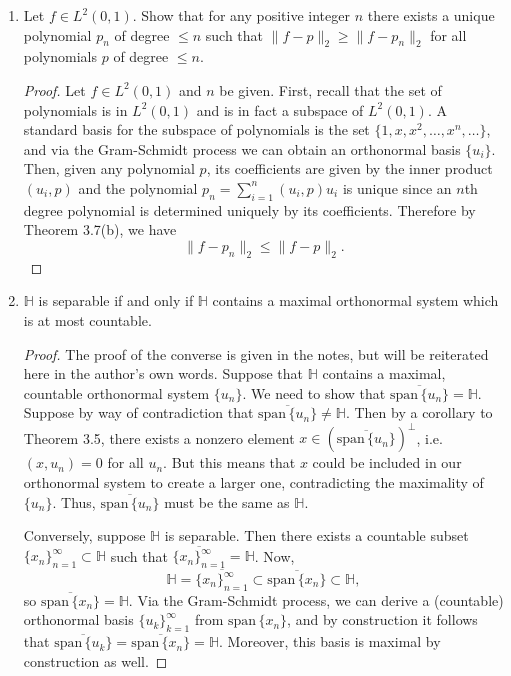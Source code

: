 \documentclass[11pt,oneside,english]{amsart}
\theoremstyle{definition}
\newcommand{\MB}[1]{\mathbb{#1}}
\begin{document}
\begin{enumerate}
\item Let $f\in L^2(0,1)$. Show that for any positive integer $n$ there exists a unique polynomial $p_n$ of degree $\leq n$ such that $\|f-p\|_2\geq \|f-p_n\|_2$ for all polynomials $p$ of degree $\leq n$.

\begin{proof}
Let $f\in L^2(0,1)$ and $n$ be given. First, recall that the set of polynomials is in $L^2(0,1)$ and is in fact a subspace of $L^2(0,1)$. A standard basis for the subspace of polynomials is the set $\{1,x,x^2,\ldots,x^n,\ldots\}$, and via the Gram-Schmidt process we can obtain an orthonormal basis $\{u_i\}$. Then, given any polynomial $p$, its coefficients are given by the inner product $(u_i,p)$ and the polynomial $p_n=\sum_{i=1}^n(u_i,p)u_i$ is unique since an $n$th degree polynomial is determined uniquely by its coefficients. Therefore by Theorem 3.7(b), we have
\[
\|f-p_n\|_2\leq \|f-p\|_2.
\]
\end{proof}

\item $\MB{H}$ is separable if and only if $\MB{H}$ contains a maximal orthonormal system which is at most countable.

\begin{proof}
The proof of the converse is given in the notes, but will be reiterated here in the author's own words. Suppose that $\MB{H}$ contains a maximal, countable orthonormal system $\{u_n\}$. We need to show that $\overline{\text{span}\,\{u_n\}}=\MB{H}$. Suppose by way of contradiction that $\overline{\text{span}\,\{u_n\}}\neq\MB{H}$. Then by a corollary to Theorem 3.5, there exists a nonzero element $x\in \left(\overline{\text{span}\,\{u_n\}}\right)^\perp$, i.e. $(x,u_n)=0$ for all $u_n$. But this means that $x$ could be included in our orthonormal system to create a larger one, contradicting the maximality of $\{u_n\}$. Thus, $\overline{\text{span}\,\{u_n\}}$ must be the same as $\MB{H}$.

Conversely, suppose $\MB{H}$ is separable. Then there exists a countable subset $\{x_n\}_{n=1}^\infty\subset\MB{H}$ such that $\overline{\{x_n\}_{n=1}^\infty}=\MB{H}$. Now,
\[
\MB{H}=\overline{\{x_n\}_{n=1}^\infty}\subset\overline{\text{span}\,\{x_n\}}\subset\MB{H},
\]
so $\overline{\text{span}\,\{x_n\}}=\MB{H}$. Via the Gram-Schmidt process, we can derive a (countable) orthonormal basis $\{u_k\}_{k=1}^\infty$ from $\text{span}\,\{x_n\}$, and by construction it follows that $\overline{\text{span}\,\{u_k\}}=\overline{\text{span}\,\{x_n\}}=\MB{H}$. Moreover, this basis is maximal by construction as well.
\end{proof}



\end{enumerate}
\end{document}
